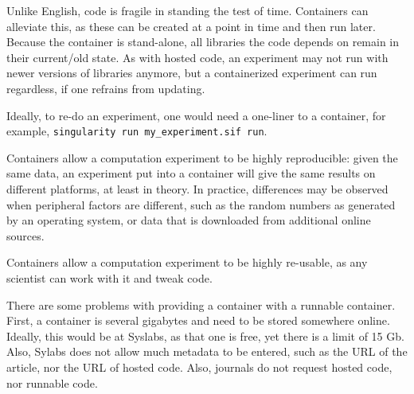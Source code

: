 
Unlike English, code is fragile in standing the test of time.
Containers can alleviate this, as these can be created at a point
in time and then run later. Because the container is stand-alone,
all libraries the code depends on remain in their current/old state.
As with hosted code, an experiment may not run with newer versions
of libraries anymore, but a containerized experiment can run regardless, if
one refrains from updating.

Ideally, to re-do an experiment, one would need a one-liner to a container,
for example, \verb|singularity run my_experiment.sif run|.


Containers allow a computation experiment to be highly reproducible:
given the same data, an experiment put into a container will give
the same results on different platforms, at least in theory.
In practice, differences may be observed when peripheral factors
are different, such as the random numbers as generated by an operating
system, or data that is downloaded from additional online sources.


Containers allow a computation experiment to be highly re-usable,
as any scientist can work with it and tweak code.


There are some problems with providing a container with a runnable container.
First, a container is several gigabytes and need to be stored somewhere
online. Ideally, this would be at Syslabs, as that one is free, yet
there is a limit of 15 Gb. Also, Sylabs does not allow much metadata to
be entered, such as the URL of the article, nor the URL of hosted code.
Also, journals do not request hosted code, nor runnable code.

